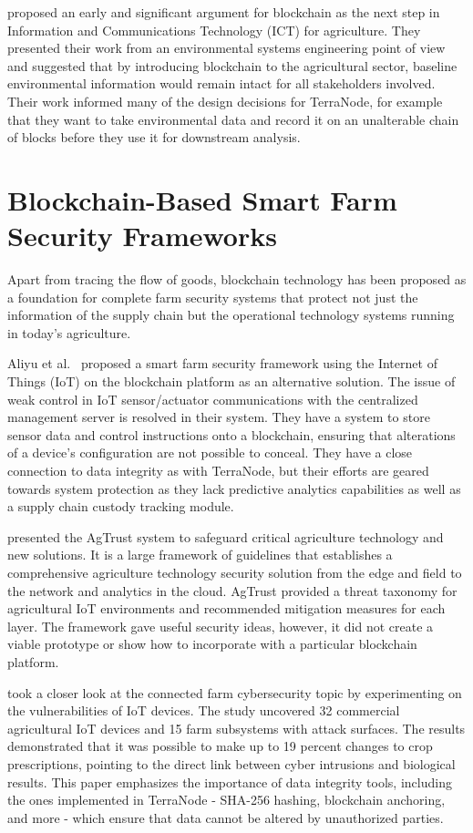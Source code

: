 \textcite{lin2017blockchain} proposed an early and significant argument for blockchain as the next step in Information and Communications Technology (ICT) for agriculture. They presented their work from an environmental systems engineering point of view and suggested that by introducing blockchain to the agricultural sector, baseline environmental information would remain intact for all stakeholders involved. Their work informed many of the design decisions for TerraNode, for example that they want to take environmental data and record it on an unalterable chain of blocks before they use it for downstream analysis.

\section{Blockchain-Based Smart Farm Security Frameworks}

Apart from tracing the flow of goods, blockchain technology has been proposed as a foundation for complete farm security systems that protect not just the information of the supply chain but the operational technology systems running in today's agriculture.

Aliyu et al.~\parencite{aliyu2023blockchain} proposed a smart farm security framework using the Internet of Things (IoT) on the blockchain platform as an alternative solution. The issue of weak control in IoT sensor/actuator communications with the centralized management server is resolved in their system. They have a system to store sensor data and control instructions onto a blockchain, ensuring that alterations of a device's configuration are not possible to conceal. They have a close connection to data integrity as with TerraNode, but their efforts are geared towards system protection as they lack predictive analytics capabilities as well as a supply chain custody tracking module.

\textcite{agtrust2026framework} presented the AgTrust system to safeguard critical agriculture technology and new solutions. It is a large framework of guidelines that establishes a comprehensive agriculture technology security solution from the edge and field to the network and analytics in the cloud. AgTrust provided a threat taxonomy for agricultural IoT environments and recommended mitigation measures for each layer. The framework gave useful security ideas, however, it did not create a viable prototype or show how to incorporate with a particular blockchain platform.

\textcite{dzreke2025securing} took a closer look at the connected farm cybersecurity topic by experimenting on the vulnerabilities of IoT devices. The study uncovered 32 commercial agricultural IoT devices and 15 farm subsystems with attack surfaces. The results demonstrated that it was possible to make up to 19 percent changes to crop prescriptions, pointing to the direct link between cyber intrusions and biological results. This paper emphasizes the importance of data integrity tools, including the ones implemented in TerraNode - SHA-256 hashing, blockchain anchoring, and more - which ensure that data cannot be altered by unauthorized parties.

